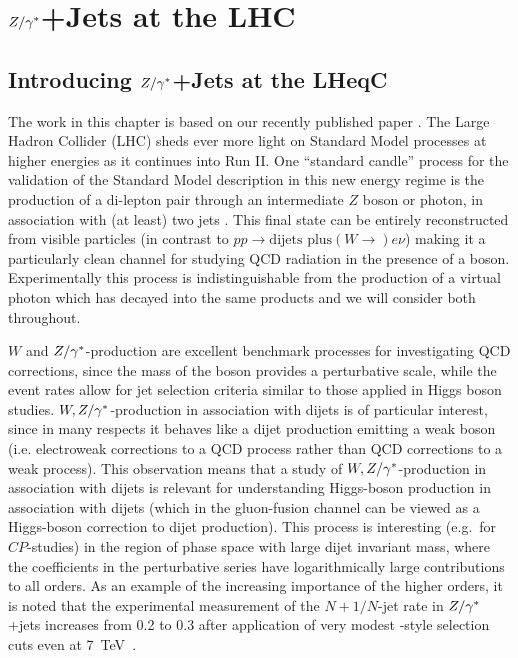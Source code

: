 \chapter{$Z/\gamma^*$+Jets at the LHC}
\label{chap:Zs}

\section{Introducing $Z/\gamma^*$+Jets at the LHeqC}

	The work in this chapter is based on our recently published paper \cite{ZPaper}.
	The Large Hadron Collider (LHC)
	sheds ever more light on Standard Model processes at higher energies as it
	continues into Run II.  One ``standard candle'' process for the validation of
	the Standard Model description in this new energy regime is the production of
	a di-lepton pair through an intermediate $Z$ boson or photon, in
	association with (at least) two jets \cite{Chatrchyan:2011ne, Aad:2011qv,
	Chatrchyan:2013tna, Aad:2013ysa, Khachatryan:2014zya, Aad:2014rta,
	Khachatryan:2014dea}.  This final state can be entirely reconstructed from
	visible particles (in contrast to $pp\to \text{dijets plus}(W\to) e\nu$) making it a particularly
	clean channel for studying QCD radiation in the presence of a boson.
	Experimentally this process is indistinguishable from the production of a
	virtual photon which has decayed into the same products and we will consider
	both throughout.

	$W$ and $Z/\gamma^*$-production are excellent benchmark processes for investigating
	QCD corrections, since the mass of the boson provides a perturbative scale,
	while the event rates allow for jet selection criteria similar to those
	applied in Higgs boson studies. $W,Z/\gamma^*$-production in association with dijets
	is of particular interest, since in many respects it behaves like a dijet
	production emitting a weak boson (i.e. electroweak corrections to a QCD
	process rather than QCD corrections to a weak process). This observation
	means that a study of $W,Z/\gamma^*$-production in association with dijets is
	relevant for understanding Higgs-boson production in association with dijets
	(which in the gluon-fusion channel can be viewed as a Higgs-boson correction
	to dijet production). This process is interesting (e.g.~for $CP$-studies) in
	the region of phase space with large dijet invariant mass, where the
	coefficients in the perturbative series have logarithmically large
	contributions to all orders. As an example of the increasing importance of
	the higher orders, it is noted that the experimental measurement of the
	$N+1/N$-jet rate in $Z/\gamma^*$+jets increases from 0.2 to 0.3 after application of
	very modest \wbf-style selection cuts even at 7~TeV~\cite{Chatrchyan:2011ne,Aad:2011qv,Aad:2013ysa}.

